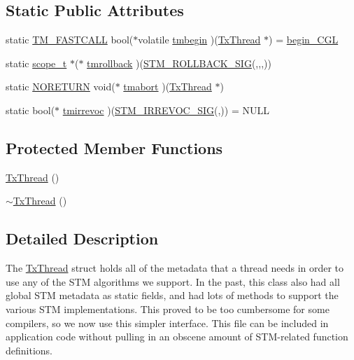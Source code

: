 \subsection*{Static Public Attributes}
\begin{DoxyCompactItemize}
\item 
static \hyperlink{platform_8hpp_a8b5d728e6eed8f368f9966f637d2f719}{T\-M\-\_\-\-F\-A\-S\-T\-C\-A\-L\-L} bool($\ast$volatile \hyperlink{structstm_1_1TxThread_a4822898342c30b679a25a8a2dd46c747}{tmbegin} )(\hyperlink{structstm_1_1TxThread}{Tx\-Thread} $\ast$) = \hyperlink{namespacestm_a74784f193abf87bd1c6f688d6b25cacd}{begin\-\_\-\-C\-G\-L}
\item 
static \hyperlink{namespacestm_a91badf88c88aacc831b01a315435a255}{scope\-\_\-t} $\ast$($\ast$ \hyperlink{structstm_1_1TxThread_a81a345efa23f5511ed79cb41e03445b6}{tmrollback} )(\hyperlink{include_2stm_2macros_8hpp_a1c36a48149c84f90d5bca01019950ca9}{S\-T\-M\-\_\-\-R\-O\-L\-L\-B\-A\-C\-K\-\_\-\-S\-I\-G}(,,,))
\item 
static \hyperlink{platform_8hpp_aa1728270d73c5d1598de1fd691762eb1}{N\-O\-R\-E\-T\-U\-R\-N} void($\ast$ \hyperlink{structstm_1_1TxThread_a5ca3c353e5b0e305d841b48aceb4de2f}{tmabort} )(\hyperlink{structstm_1_1TxThread}{Tx\-Thread} $\ast$)
\item 
static bool($\ast$ \hyperlink{structstm_1_1TxThread_a1052fca6b76285b98233a67f9a865775}{tmirrevoc} )(\hyperlink{include_2stm_2macros_8hpp_acf117c2df6442342f6603e1a12fa3b5c}{S\-T\-M\-\_\-\-I\-R\-R\-E\-V\-O\-C\-\_\-\-S\-I\-G}(,)) = N\-U\-L\-L
\end{DoxyCompactItemize}
\subsection*{Protected Member Functions}
\begin{DoxyCompactItemize}
\item 
\hyperlink{structstm_1_1TxThread_a27aa264d621bb5d008571c6aab47a9ba}{Tx\-Thread} ()
\item 
\hyperlink{structstm_1_1TxThread_a28a46b3697018d74c52a306b9177f416}{$\sim$\-Tx\-Thread} ()
\end{DoxyCompactItemize}


\subsection{Detailed Description}
The \hyperlink{structstm_1_1TxThread}{Tx\-Thread} struct holds all of the metadata that a thread needs in order to use any of the S\-T\-M algorithms we support. In the past, this class also had all global S\-T\-M metadata as static fields, and had lots of methods to support the various S\-T\-M implementations. This proved to be too cumbersome for some compilers, so we now use this simpler interface. This file can be included in application code without pulling in an obscene amount of S\-T\-M-\/related function definitions.

